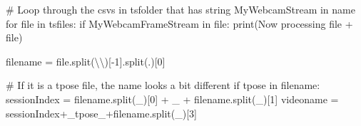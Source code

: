\documentclass[
  letterpaper,
  DIV=11,
  numbers=noendperiod]{scrreprt}
\newenvironment{Shaded}{\begin{snugshade}}{\end{snugshade}}
\newcommand{\BuiltInTok}[1]{\textcolor[rgb]{0.00,0.23,0.31}{#1}}
\newcommand{\CharTok}[1]{\textcolor[rgb]{0.13,0.47,0.30}{#1}}
\newcommand{\CommentTok}[1]{\textcolor[rgb]{0.37,0.37,0.37}{#1}}
\newcommand{\ControlFlowTok}[1]{\textcolor[rgb]{0.00,0.23,0.31}{#1}}
\newcommand{\DecValTok}[1]{\textcolor[rgb]{0.68,0.00,0.00}{#1}}
\newcommand{\KeywordTok}[1]{\textcolor[rgb]{0.00,0.23,0.31}{#1}}
\newcommand{\NormalTok}[1]{\textcolor[rgb]{0.00,0.23,0.31}{#1}}
\newcommand{\OperatorTok}[1]{\textcolor[rgb]{0.37,0.37,0.37}{#1}}
\newcommand{\StringTok}[1]{\textcolor[rgb]{0.13,0.47,0.30}{#1}}
\begin{document}
\begin{Shaded}
\begin{Highlighting}[]
\CommentTok{\# Loop through the csv\textquotesingle{}s in tsfolder that has string \textquotesingle{}MyWebcamStream\textquotesingle{} in name}
\ControlFlowTok{for} \BuiltInTok{file} \KeywordTok{in}\NormalTok{ tsfiles:}
    \ControlFlowTok{if} \StringTok{\textquotesingle{}MyWebcamFrameStream\textquotesingle{}} \KeywordTok{in} \BuiltInTok{file}\NormalTok{:}
        \BuiltInTok{print}\NormalTok{(}\StringTok{\textquotesingle{}Now processing file \textquotesingle{}}\OperatorTok{+} \BuiltInTok{file}\NormalTok{)}

\NormalTok{        filename }\OperatorTok{=} \BuiltInTok{file}\NormalTok{.split(}\StringTok{\textquotesingle{}}\CharTok{\textbackslash{}\textbackslash{}}\StringTok{\textquotesingle{}}\NormalTok{)[}\OperatorTok{{-}}\DecValTok{1}\NormalTok{].split(}\StringTok{\textquotesingle{}.\textquotesingle{}}\NormalTok{)[}\DecValTok{0}\NormalTok{]}

        \CommentTok{\# If it is a tpose file, the name looks a bit different}
        \ControlFlowTok{if} \StringTok{\textquotesingle{}tpose\textquotesingle{}} \KeywordTok{in}\NormalTok{ filename:}
\NormalTok{            sessionIndex }\OperatorTok{=}\NormalTok{ filename.split(}\StringTok{\textquotesingle{}\_\textquotesingle{}}\NormalTok{)[}\DecValTok{0}\NormalTok{] }\OperatorTok{+} \StringTok{\textquotesingle{}\_\textquotesingle{}} \OperatorTok{+}\NormalTok{ filename.split(}\StringTok{\textquotesingle{}\_\textquotesingle{}}\NormalTok{)[}\DecValTok{1}\NormalTok{]}
\NormalTok{            videoname }\OperatorTok{=}\NormalTok{ sessionIndex}\OperatorTok{+}\StringTok{\textquotesingle{}\_tpose\_\textquotesingle{}}\OperatorTok{+}\NormalTok{filename.split(}\StringTok{\textquotesingle{}\_\textquotesingle{}}\NormalTok{)[}\DecValTok{3}\NormalTok{]}


\end{Highlighting}
\end{Shaded}
\end{document}
